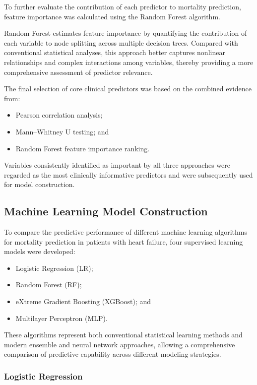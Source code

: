 \documentclass[12pt]{article}
\begin{document}
To further evaluate the contribution of each predictor to mortality prediction, feature importance was calculated using the Random Forest algorithm.

Random Forest estimates feature importance by quantifying the contribution of each variable to node splitting across multiple decision trees. Compared with conventional statistical analyses, this approach better captures nonlinear relationships and complex interactions among variables, thereby providing a more comprehensive assessment of predictor relevance.

The final selection of core clinical predictors was based on the combined evidence from:

\begin{itemize}
    \item Pearson correlation analysis; 
    \item Mann–Whitney U testing; and 
    \item Random Forest feature importance ranking. 
\end{itemize}
Variables consistently identified as important by all three approaches were regarded as the most clinically informative predictors and were subsequently used for model construction. 

\subsection{Machine Learning Model Construction}

To compare the predictive performance of different machine learning algorithms for mortality prediction in patients with heart failure, four supervised learning models were developed:

\begin{itemize}
    \item Logistic Regression (LR); 
    \item Random Forest (RF); 
    \item eXtreme Gradient Boosting (XGBoost); and 
    \item Multilayer Perceptron (MLP). 
\end{itemize}
These algorithms represent both conventional statistical learning methods and modern ensemble and neural network approaches, allowing a comprehensive comparison of predictive capability across different modeling strategies. 

\subsubsection{Logistic Regression}
\end{document}
